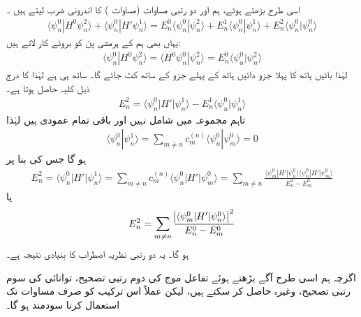  اسی طرح بڑھتے ہوئے،  ہم  اور دو رتبی مساوات (مساوات ) کا اندرونی ضرب لیتے ہیں ۔
\begin{align*}
\langle \psi_n^0 | H^0 \psi_n^2 \rangle + \langle \psi_n^0 | H' \psi_n^1 \rangle = E_n^0 \langle \psi_n^0 | \psi_n^2 \rangle + E_n^1 \langle \psi_n^0 | \psi_n^1 \rangle + E_n^2 \langle \psi_n^0 | \psi_n^0 \rangle
\end{align*}
یہاں بھی ہم  کے ہرمشی پن کو بروئے کار لاتے ہیں: 
\begin{align*}
\langle \psi_n^0 | H^0 \psi_n^2 \rangle = \langle H^0 \psi_n^0 | \psi_n^2 \rangle = E_n^0 \langle \psi_n^0 | \psi_n^2 \rangle
\end{align*}
 لہٰذا  بائیں ہاتھ کا پہلا جزو دائیں ہاتھ کے پہلے جزو کے ساتھ کٹ جائے گا۔   ساتھ   ہی  ہے    لہٰذا     کا درج ذیل  کلیہ حاصل ہوتا ہے۔
\begin{align}
E_n^2 = \langle \psi_n^0 | H' | \psi_n^1 \rangle - E_n^1 \langle \psi_n^0 | \psi_n^1 \rangle
\end{align}
تاہم  مجموعہ  میں  شامل نہیں  اور  باقی تمام عمودی ہیں  لہٰذا  
\begin{align*}
\langle \psi_n^0 | \psi_n^1 \rangle  = \sum_{m \ne n} c_m^{(n)} \langle \psi_n^0 | \psi_m^0 \rangle = 0
\end{align*}
 ہو گا جس کی بنا پر 
\begin{align*}
E_n^2 = \langle \psi_n^0 | H' | \psi_n^1 \rangle = \sum_{m \ne n} c_m^{(n)} \langle \psi_n^0 | H' | \psi_m^0 \rangle = \sum_{m \ne n} \frac{\langle \psi_m^0 | H' | \psi_n^0 \rangle \langle \psi_n^0 | H' | \psi_m^0 \rangle }{E_n^0 - E_m^0}
\end{align*}
یا  
\begin{align}\label{مساوات_غیر_اضطراب_دوم_رتبی_نتیجہ}
E_n^2 = \sum_{m \ne n} \frac{ \abs{ \langle \psi_m^0 | H' | \psi_n^0\rangle }^2 }{E_n^0 - E_m^0}
\end{align}
 ہو گا۔ یہ  دو رتبی نظریہ اضطراب کا بنیادی نتیجہ ہے۔

 اگرچہ ہم اسی طرح آگے بڑھتے ہوئے تفاعل موج      کی  دوم رتبی تصحیح،  توانائی کی سوم  رتبی تصحیح،  وغیرہ  حاصل کر سکتے ہیں،  لیکن عملاً اس ترکیب کو صرف مساوات  تک استعمال کرنا سودمند  ہو گا۔
 
